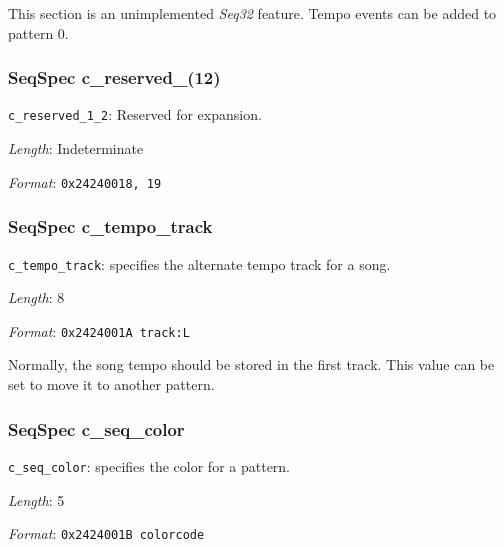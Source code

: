    This section is an unimplemented \textsl{Seq32} feature.
   Tempo events can be added to pattern 0.

\subsubsection{SeqSpec c\_reserved\_(12)}
\label{subsubsec:midi_format_track_seqspec_reserved_1_2}

   \begin{description}
      \item \texttt{c\_reserved\_1\_2}: Reserved for expansion.
      \item \textsl{Length}: Indeterminate
      \item \textsl{Format}: \texttt{0x24240018, 19}
   \end{description}

\subsubsection{SeqSpec c\_tempo\_track}
\label{subsubsec:midi_format_track_seqspec_tempo_track}

   \begin{description}
      \item \texttt{c\_tempo\_track}:
         specifies the alternate tempo track for a song.
      \item \textsl{Length}: 8
      \item \textsl{Format}: \texttt{0x2424001A track:L}
   \end{description}

   Normally, the song tempo should be stored in the first track.
   This value can be set to move it to another pattern.

\subsubsection{SeqSpec c\_seq\_color}
\label{subsubsec:midi_format_track_seqspec_seq_color}

   \begin{description}
      \item \texttt{c\_seq\_color}: specifies the color for a pattern.
      \item \textsl{Length}: 5
      \item \textsl{Format}: \texttt{0x2424001B colorcode}
   \end{description}

